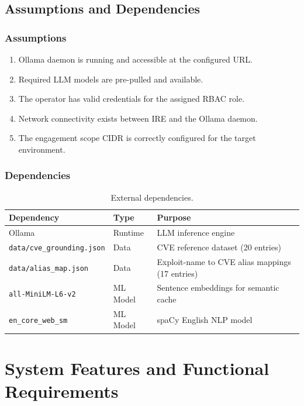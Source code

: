 ﻿\documentclass[10pt,journal,onecolumn]{IEEEtran}
\begin{document}
\subsection{Assumptions and Dependencies}

\subsubsection{Assumptions}
\begin{enumerate}
\item Ollama daemon is running and accessible at the configured URL.
\item Required LLM models are pre-pulled and available.
\item The operator has valid credentials for the assigned RBAC role.
\item Network connectivity exists between IRE and the Ollama daemon.
\item The engagement scope CIDR is correctly configured for the target environment.
\end{enumerate}

\subsubsection{Dependencies}
\begin{table}[h]
\caption{External dependencies.}
\label{tab:deps}
\begin{tabularx}{\columnwidth}{l l X}
\toprule
\textbf{Dependency} & \textbf{Type} & \textbf{Purpose}\\
\midrule
Ollama & Runtime & LLM inference engine\\
\texttt{data/cve\_grounding.json} & Data & CVE reference dataset (20 entries)\\
\texttt{data/alias\_map.json} & Data & Exploit-name to CVE alias mappings (17 entries)\\
\texttt{all-MiniLM-L6-v2} & ML Model & Sentence embeddings for semantic cache\\
\texttt{en\_core\_web\_sm} & ML Model & spaCy English NLP model\\
\bottomrule
\end{tabularx}
\end{table}
\section{System Features and Functional Requirements}
\end{document}
